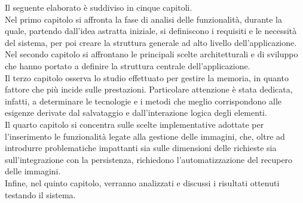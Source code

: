 Il seguente elaborato è suddiviso in cinque capitoli.\\
Nel primo capitolo si affronta la fase di analisi delle funzionalità,
durante la quale, partendo dall'idea astratta iniziale,
si definiscono i requisiti e le necessità del sistema,
per poi creare la struttura generale ad alto livello dell'applicazione.\\
Nel secondo capitolo si affrontano le principali scelte architetturali e di sviluppo
che hanno portato a definire la struttura centrale dell’applicazione.\\
Il terzo capitolo osserva lo studio effettuato per gestire la memoria, 
in quanto fattore che più incide sulle prestazioni. 
Particolare attenzione è stata dedicata, infatti, 
a determinare le tecnologie e i metodi che meglio corrispondono alle esigenze 
derivate dal salvataggio e dall’interazione logica degli elementi.\\
Il quarto capitolo si concentra sulle scelte implementative adottate 
per l’inserimento le funzionalità legate alla gestione delle immagini,
che, oltre ad introdurre problematiche impattanti sia sulle dimensioni delle richieste 
sia sull'integrazione con la persistenza, 
richiedono l'automatizzazione del recupero delle immagini.\\
Infine, nel quinto capitolo, verranno analizzati e discussi i risultati ottenuti
testando il sistema.


\clearpage
